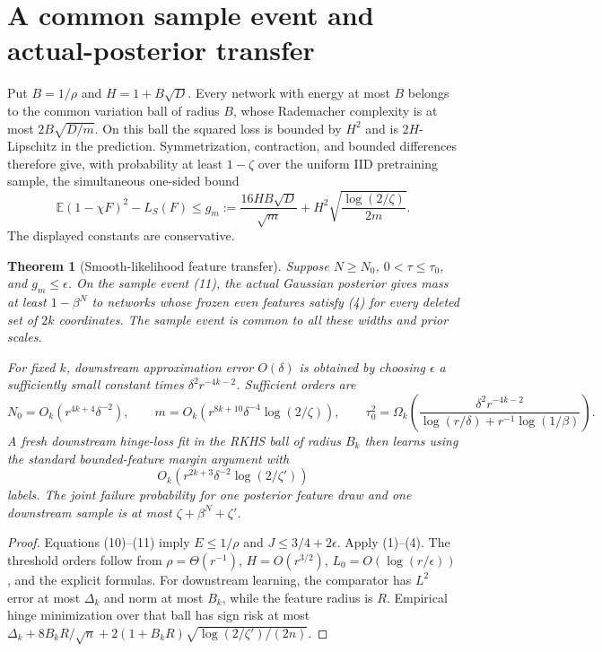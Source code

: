 \documentclass[11pt]{article}
\newtheorem{theorem}{Theorem}\newtheorem{lemma}[theorem]{Lemma}
\newcommand{\E}{\mathbb E}\newcommand{\R}{\mathbb R}
\begin{document}
\section{A common sample event and actual-posterior transfer}
Put $B=1/\rho$ and $H=1+B\sqrt D$.
Every network with energy at most $B$ belongs to the common variation
ball of radius $B$, whose Rademacher complexity is at most
$2B\sqrt{D/m}$. On this ball the squared loss is bounded by $H^2$
and is $2H$-Lipschitz in the prediction.
Symmetrization, contraction, and bounded differences therefore give,
with probability at least $1-\zeta$ over the uniform IID pretraining
sample, the simultaneous one-sided bound
\[
 \E(1-\chi F)^2-L_S(F)
 \le g_m:=\frac{16HB\sqrt D}{\sqrt m}
                 +H^2\sqrt{\frac{\log(2/\zeta)}{2m}}.    \tag{11}
\]
The displayed constants are conservative.

\begin{theorem}[Smooth-likelihood feature transfer]
Suppose $N\ge N_0$, $0<\tau\le\tau_0$, and $g_m\le\epsilon$.
On the sample event (11), the actual Gaussian posterior gives mass at
least $1-\beta^N$ to networks whose frozen even features satisfy (4)
for every deleted set of $2k$ coordinates.
The sample event is common to all these widths and prior scales.

For fixed $k$, downstream approximation error $O(\delta)$ is obtained
by choosing $\epsilon$ a sufficiently small constant times
$\delta^2r^{-4k-2}$. Sufficient orders are
\[
 N_0=O_k(r^{4k+4}\delta^{-2}),\qquad
 m=O_k(r^{8k+10}\delta^{-4}\log(2/\zeta)),\qquad
 \tau_0^2=\Omega_k\left(
 \frac{\delta^2r^{-4k-2}}
 {\log(r/\delta)+r^{-1}\log(1/\beta)}\right).
 \tag{12}
\]
A fresh downstream hinge-loss fit in the RKHS ball of radius $B_k$
then learns using the standard bounded-feature margin argument with
\[
                 O_k(r^{2k+3}\delta^{-2}\log(2/\zeta'))
\]
labels.
The joint failure probability for one posterior feature draw and one
downstream sample is at most $\zeta+\beta^N+\zeta'$.
\end{theorem}
\begin{proof}
Equations (10)--(11) imply $E\le1/\rho$ and $J\le3/4+2\epsilon$.
Apply (1)--(4). The threshold orders follow from
$\rho=\Theta(r^{-1})$, $H=O(r^{3/2})$,
$L_0=O(\log(r/\epsilon))$, and the explicit formulas.
For downstream learning, the comparator has $L^2$ error at most
$\Delta_k$ and norm at most $B_k$, while the feature radius is $R$.
Empirical hinge minimization over that ball has sign risk at most
$\Delta_k+8B_kR/\sqrt n+
2(1+B_kR)\sqrt{\log(2/\zeta')/(2n)}$.
\end{proof}
\end{document}
